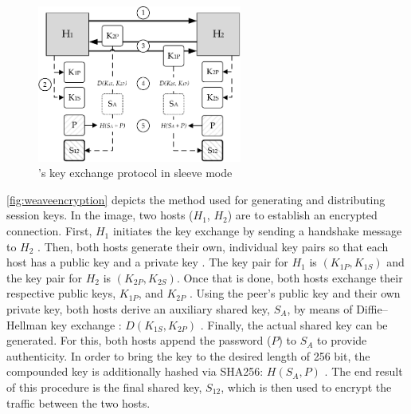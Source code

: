 \begin{figure}[htpb]
  \centering
  \includegraphics[width=0.6\textwidth]{figures/weave-encryption.pdf}
  \caption[\weave 's key exchange protocol]{\wnet 's key exchange protocol in sleeve mode}\label{fig:weaveencryption}
\end{figure} 
\autoref{fig:weaveencryption} depicts the method used for generating and distributing session keys. In the image, two hosts ($H_1$, $H_2$) are to establish an encrypted connection. First, $H_1$ initiates the key exchange by sending a handshake message to $H_2$ . Then, both hosts generate their own, individual key pairs so that each host has a public key and a private key . The key pair for $H_1$ is $(K_{1P}, K_{1S})$ and the key pair for $H_2$ is $(K_{2P}, K_{2S})$. Once that is done, both hosts exchange their respective public keys, $K_{1P}$, and $K_{2P}$ . Using the peer's public key and their own private key, both hosts derive an auxiliary shared key, $S_A$, by means of Diffie--Hellman key exchange \cite{bresson2001provably}: $D(K_{1S},K_{2P})$ . Finally, the actual shared key can be generated. For this, both hosts append the password ($P$) to $S_A$ to provide authenticity. In order to bring the key to the desired length of 256 bit, the compounded key is additionally hashed via SHA256: $H(S_A, P)$ . The end result of this procedure is the final shared key, $S_{12}$, which is then used to encrypt the traffic between the two hosts.
%
%
%
%
%
%
%
%
%
%
%
%
%
%
%
%
%
%
%
%